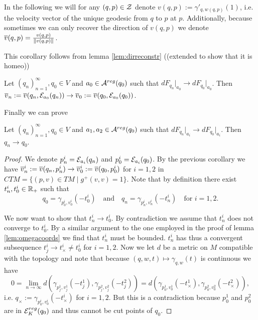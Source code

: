 In the following we will for any $(q,p)\in {\mathcal{Z}}$ denote $v(q,p):=\gamma'_{q,w(q,p)}(1)$, i.e. the velocity vector of the unique geodesic from $q$ to $p$ at $p$. Additionally, because sometimes we can only recover the direction of $v(q,p)$ we denote ${\overline{v}}(q,p) = \frac{v(q,p)}{\lVert v(q,p) \rVert}$.

This corollary follows from lemma \ref{lem:dirreconstr} ((extended to show that it is homeo))
\begin{corollary}\label{cor:dfconvimplpliesvconv}
    Let $(q_n)_{n=1}^\infty, q_0\in V$ and $a_0\in {{\mathcal{A}}^{reg}}(q_0)$ such that $dF_{q_n}\rvert_{a_0} \to dF_{q_0}\rvert_{a_0}$. Then ${\overline{v}}_n:={\overline{v}}(q_n,{\mathcal{E}}_{a_0}(q_n))\to {\overline{v}}_0:={\overline{v}}(q_0,{\mathcal{E}}_{a_0}(q_0))$.
\end{corollary}

Finally we can prove 
\begin{proposition}\label{prop:dfconvimplqconv}
    Let $(q_n)_{n=1}^\infty, q_0\in V$ and $a_1,a_2\in {{\mathcal{A}}^{reg}}(q_0)$ such that $dF_{q_n}\rvert_{a_i} \to dF_{q_0}\rvert_{a_i}$. Then $q_n \to q_0$.
\end{proposition}
\begin{proof}
    We denote $p_n^i = {\mathcal{E}}_{a_i}(q_n)$ and $p_0^i = {\mathcal{E}}_{a_i}(q_0)$.
    By the previous corollary we have ${\overline{v}}^i_n:={\overline{v}}(q_n,p_n^i)\to {\overline{v}}^i_0:={\overline{v}}(q_0,p_0^i)$ for $i=1,2$ in $CTM=\{(p,v)\in TM \mid g^+(v,v)=1\}$.
    Note that by definition there exist $t^i_n, t^i_0 \in \mathbb{R}_+$ such that 
    \[
        q_0 = \gamma_{p^i_0,v^i_0}(-t^i_0) \quad \text{and} \quad q_n = \gamma_{p^i_n,v^i_n}(-t^i_n) \quad \text{for }i = 1,2.
    \]

    We now want to show that $t^i_n\to t^i_0$. By contradiction we assume that $t^i_n$ does not converge to $t^i_0$. By a similar argument to the one employed in the proof of lemma \ref{lem:omegacoords} we find that $t^i_n$ must be bounded. $t^i_n$ has thus a convergent subsequence $t^i_j\to t^i_\times \neq t^i_0$ for $i=1,2$. Now we let $d$ be a metric on $M$ compatible with the topology and note that because $(q,w,t)\mapsto \gamma_{q,w}(t)$ is continuous we have
    \[
        0 = \lim_{n\to \infty} d(\gamma_{p^1_j,v^1_j}(-t^1_j),\gamma_{p^2_j,v^2_j}(-t^2_j)) = d(\gamma_{p^1_0,v^1_0}(-t^1_\times),\gamma_{p^2_0,v^2_0}(-t^2_\times)),
    \]i.e. $q_\times:=\gamma_{p^i_0,v^i_0}(-t^i_\times)$ for $i=1,2$. But this is a contradiction because $p^1_0$ and $p^2_0$ are in ${{\mathcal{E}}^{reg}_K}(q_0)$ and thus cannot be cut points of $q_0$.
\end{proof}

